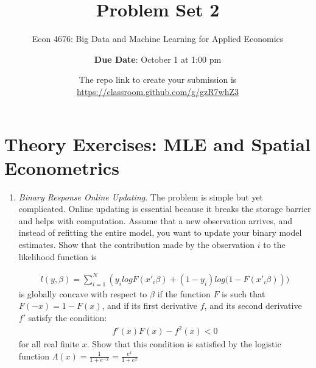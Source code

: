 \documentclass[12pt,onecolumn]{article}
\title{Problem Set 2}
\subtitle{Econ 4676: Big Data and Machine Learning for Applied Economics}
\author{{\bf Due Date}: October 1 at 1:00 pm}
\date{}
\date{The repo link to create your submission is \url{https://classroom.github.com/g/gzR7whZ3}}
\begin{document}
\maketitle

\section{Theory Exercises: MLE and Spatial Econometrics}

\begin{enumerate}
  
  \item {\it Binary Response Online Updating}. The problem is simple but yet complicated. Online updating is essential because it breaks the storage barrier and helps with computation. Assume that a new observation arrives, and instead of refitting the entire model, you want to update your binary model estimates. Show that the contribution made by the observation $i$ to the likelihood function is

\begin{align}
l(y,\beta) = \sum_{i=1}^N \left( y_i log F(x'_i\beta) + (1-y_i) log (1-F(x'_i\beta)  \right))
\end{align}
  is globally concave with respect to $\beta$ if the function $F$ is such that $F(-x)=1-F(x)$, and if its first derivative $f$, and its second derivative $f'$ satisfy the condition:
  \begin{align}
  f'(x)F(x)-f^2(x)<0
  \end{align}
  for all real finite $x$. Show that this condition is satisfied by the logistic function $\Lambda(x)=\frac{1}{1+e^{-x}}=\frac{e^{x}}{1+e^{x}}$


\end{enumerate}
\end{document}
